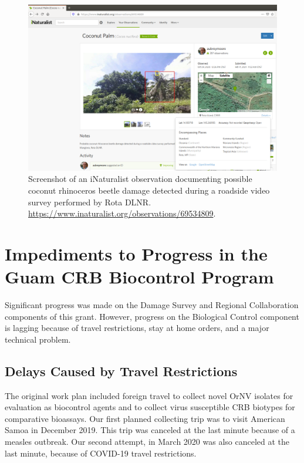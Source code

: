 \documentclass[12pt,letterpaper,english,bibliography=totocnumbered,abstract=on]{scrartcl}
\begin{document}
\begin{figure}[h]
	\centering
	\includegraphics[width=1\linewidth]{images/Rota-iNat-obs}
	\caption{Screenshot of an iNaturalist observation documenting possible coconut rhinoceros beetle damage detected during a roadside video survey performed by Rota DLNR. \url{https://www.inaturalist.org/observations/69534809}.}
	\label{fig:rota-inat-obs}
\end{figure}

\newpage




\section{Impediments to Progress in the Guam CRB Biocontrol Program}
\label{impediments}
Significant progress was made on the Damage Survey and Regional Collaboration
components of this grant. However, progress on the Biological Control component is
lagging because of travel restrictions, stay at home orders, and a major technical problem.

\subsection{Delays Caused by Travel Restrictions}
\label{covid}

The original work plan included foreign travel to collect novel OrNV isolates for evaluation
as biocontrol agents and to collect virus susceptible CRB biotypes for comparative bioassays.
Our first planned collecting trip was to visit American Samoa in December 2019. This trip
was canceled at the last minute because of a measles outbreak. Our second attempt, in
March 2020 was also canceled at the last minute, because of COVID-19 travel restrictions.
\end{document}

